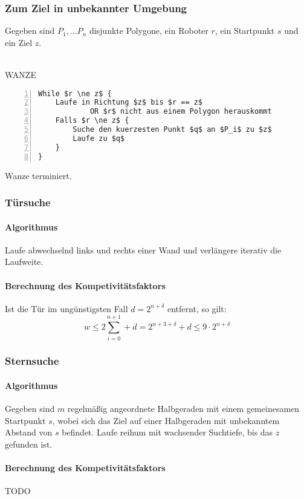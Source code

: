 \subsubsection{Zum Ziel in unbekannter Umgebung}
Gegeben sind \(P_1,...P_n\) disjunkte Polygone, ein Roboter \(r\), ein Startpunkt \(s\) und ein Ziel \(z\).
\\\\
\begin{minipage}{\textwidth}
WANZE
\begin{lstlisting}[frame=single,numbers=left,mathescape]
While $r \ne z$ {
	Laufe in Richtung $z$ bis $r == z$
			OR $r$ nicht aus einem Polygon herauskommt
	Falls $r \ne z$ {
		Suche den kuerzesten Punkt $q$ an $P_i$ zu $z$
		Laufe zu $q$
	}
}
\end{lstlisting}
\end{minipage}
Wanze terminiert.

\subsubsection{Türsuche}
\paragraph{Algorithmus} Laufe abwechselnd links und rechts einer Wand und verlängere iterativ die Laufweite.

\paragraph{Berechnung des Kompetivitätsfaktors}
Ist die Tür im ungünstigsten Fall \(d = 2^{n + \delta}\) entfernt, so gilt:
\[w \leq 2 \sum_{i=0}^{n+1} + d = 2^{n+3+\delta} + d \leq 9 \cdot 2^{n+\delta}\]

\subsubsection{Sternsuche}
\paragraph{Algorithmus} Gegeben sind \(m\) regelmäßig angeordnete Halbgeraden mit einem gemeinesamen Startpunkt \(s\), wobei sich das Ziel auf einer Halbgeraden mit unbekanntem Abstand von \(s\) befindet. Laufe reihum mit wachsender Suchtiefe, bis das \(z\) gefunden ist.

\paragraph{Berechnung des Kompetivitätsfaktors}
TODO

